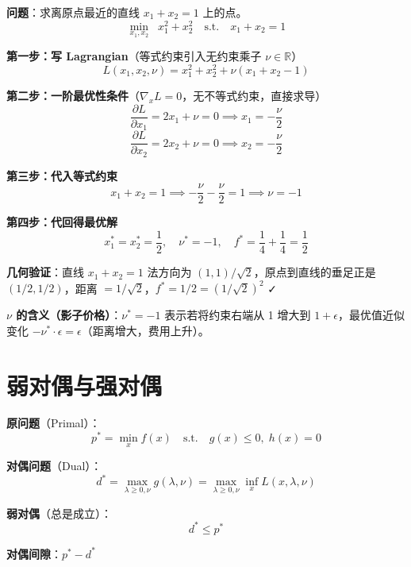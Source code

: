 \documentclass[12pt, a4paper]{ctexart}
\begin{document}
\begin{blackboard}

\textbf{问题}：求离原点最近的直线 $x_1 + x_2 = 1$ 上的点。
\[
\min_{x_1, x_2} \;\; x_1^2 + x_2^2 \quad \text{s.t.} \quad x_1 + x_2 = 1
\]

\textbf{第一步：写 Lagrangian}（等式约束引入无约束乘子 $\nu \in \mathbb{R}$）
\[
L(x_1, x_2, \nu) = x_1^2 + x_2^2 + \nu(x_1 + x_2 - 1)
\]

\textbf{第二步：一阶最优性条件}（$\nabla_x L = 0$，无不等式约束，直接求导）
\[
\frac{\partial L}{\partial x_1} = 2x_1 + \nu = 0 \implies x_1 = -\frac{\nu}{2}
\]
\[
\frac{\partial L}{\partial x_2} = 2x_2 + \nu = 0 \implies x_2 = -\frac{\nu}{2}
\]

\textbf{第三步：代入等式约束}
\[
x_1 + x_2 = 1 \implies -\frac{\nu}{2} - \frac{\nu}{2} = 1 \implies \nu = -1
\]

\textbf{第四步：代回得最优解}
\[
x_1^* = x_2^* = \frac{1}{2}, \quad \nu^* = -1, \quad f^* = \frac{1}{4} + \frac{1}{4} = \frac{1}{2}
\]

\textbf{几何验证}：直线 $x_1 + x_2 = 1$ 法方向为 $(1,1)/\sqrt{2}$，原点到直线的垂足正是 $(1/2, 1/2)$，距离 $= 1/\sqrt{2}$，$f^* = 1/2 = (1/\sqrt{2})^2$ ✓

\textbf{$\nu$ 的含义（影子价格）}：$\nu^* = -1$ 表示若将约束右端从 1 增大到 $1+\epsilon$，最优值近似变化 $-\nu^* \cdot \epsilon = \epsilon$（距离增大，费用上升）。

\end{blackboard}

\section{弱对偶与强对偶}

\begin{blackboard}[对偶问题]

\textbf{原问题}（Primal）：
\[
p^* = \min_x f(x) \quad \text{s.t.} \quad g(x) \leq 0, \; h(x) = 0
\]

\textbf{对偶问题}（Dual）：
\[
d^* = \max_{\lambda \geq 0, \nu} g(\lambda, \nu) = \max_{\lambda \geq 0, \nu} \inf_x L(x, \lambda, \nu)
\]

\textbf{弱对偶}（总是成立）：
\[
d^* \leq p^*
\]

\textbf{对偶间隙}：$p^* - d^*$

\end{blackboard}
\end{document}
